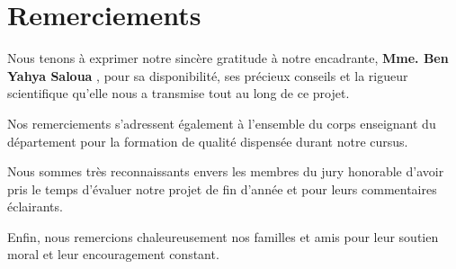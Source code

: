 \chapter*{Remerciements}

Nous tenons à exprimer notre sincère gratitude à notre encadrante,
\textbf{Mme. Ben Yahya Saloua }, pour sa disponibilité, ses précieux conseils
et la rigueur scientifique qu'elle nous a transmise tout au long de ce projet.

Nos remerciements s'adressent également à l'ensemble du corps enseignant du département pour
la formation de qualité dispensée durant notre cursus.

Nous sommes très reconnaissants envers les membres du jury honorable d’avoir pris le temps
d’évaluer notre projet de fin d’année et pour leurs commentaires éclairants.

Enfin, nous remercions chaleureusement nos familles et amis pour leur soutien moral
et leur encouragement constant.
 
